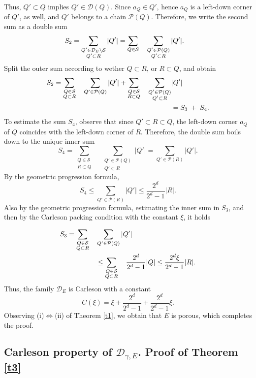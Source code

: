 \documentclass[12pt]{amsart} \setlength{\textwidth}{15cm} \setlength{\textheight}{24cm} \setlength{\voffset}{-1cm} \setlength{\oddsidemargin}{-0.4cm} \setlength{\evensidemargin}{-0.4cm}
\theoremstyle{definition}
\theoremstyle{remark}
\begin{document}
Thus, $Q'\subset Q$ implies   $Q'\in \mathcal{D}(Q)$. Since $a_Q \in Q'$, hence $a_Q$ is a left-down corner of $Q'$, as well, and $Q'$ belongs to a
 chain $\mathcal{P}(Q)$.
Therefore, we  write the second sum as a double sum
\[
\aligned
S_2
&=\sum_{\substack {Q' \in  \mathcal{D}_E \setminus \mathcal{S}\\ Q' \subset R}} |Q'|
 =\sum_{Q \in \mathcal{S}} \quad\sum_{\substack {Q'\in  \mathcal{P}(Q) \\Q'\subset R}}  |Q'|.
\endaligned
\]
Split the  outer sum according to wether $Q\subset R$, or $R\subset Q$, and obtain
\[
\aligned
S_2
=\sum_{\substack {Q \in \mathcal{S}\\ Q \subset R}} \quad\sum_{Q' \in  \mathcal{P}(Q)}  |Q'|+
\sum_{\substack {Q \in \mathcal{S}\\ R\subset Q}} \quad\sum_{\substack {Q' \in  \mathcal{P}(Q)\\ Q'\subset R}}& |Q'|\\
&=S_3\; + \; S_4.
\endaligned
\]
To estimate the  sum $S_4$,  observe that since $Q' \subset R \subset Q$, the left-down corner $a_Q$ of $Q$ coincides with the  left-down corner  of $R$. Therefore,  the double sum boils down to the unique inner sum
\[
S_4=\sum_{\substack {Q \in \mathcal{S}\\ R\subset Q}} \quad\sum_{\substack {Q' \in  \mathcal{P}(Q)\\ Q'\subset R}} |Q'|=
\sum_{Q' \in  \mathcal{P}(R)} |Q'|.
\]
By the  geometric progression formula,
\[S_4 \leq \sum_{Q' \in  \mathcal{P}(R)} |Q'|\leq \frac{2^d}{2^d-1}|R|.\]
Also by the  geometric progression formula, estimating the inner sum  in $S_3$,  and then by the Carleson packing condition with the constant $\xi$, it holds

\[
\aligned
S_3
 =\sum_{\substack {Q \in \mathcal{S}\\ Q \subset R}} \quad &\sum_{Q' \in  \mathcal{P}(Q)}  |Q'|\\
&\leq \sum_{\substack {Q \in \mathcal{S}\\ Q \subset R}} \quad \frac{2^d}{2^d-1}|Q|
\leq \frac{2^d \xi }{2^d-1}|R|.
\endaligned
\]
   Thus, the family $\mathcal{D}_E$ is Carleson with a constant
   \[C(\xi)=\xi + \frac{2^d}{2^d-1}+ \frac{2^d}{2^d-1} \xi. \]
     Observing   (i)$\Leftrightarrow $(ii) of Theorem \ref{t1}, we obtain  that $E$ is porous, which completes the proof.

\subsection{ Carleson property of  $ \mathcal{D}_{\gamma, E}$. Proof   of Theorem \ref{t3}}
\end{document}
